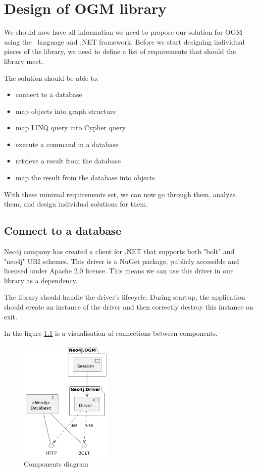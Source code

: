 \chapter {Design of OGM library}

We should now have all information we need to propose our solution for OGM using the \CS\ language and .NET framework.
Before we start designing individual pieces of the library, we need to define a list of requirements that should the library meet.

The solution should be able to:
\begin{itemize}
    \item {connect to a database}
    \item {map objects into graph structure}
    \item {map LINQ query into Cypher query}
    \item {execute a command in a database}
    \item {retrieve a result from the database}
    \item {map the result from the database into objects}
\end{itemize}

With these minimal requirements set, we can now go through them, analyze them, and design individual solutions for them.

\section{Connect to a database}

Neo4j company has created a client for .NET that supports both "bolt" and "neo4j" URI schemes. \cite{noauthor_client_nodate}
This driver is a NuGet package, publicly accessible and licensed under Apache 2.0 license.
This means we can use this driver in our library as a dependency.

The library should handle the driver's lifecycle.
During startup, the application should create an instance of the driver and then correctly destroy this instance on exit.

In the figure \ref{fig:components} is a visualisation of connections between components.

\begin{figure}[H]
    \centering
    \includegraphics[width=0.4\textwidth]{content/components.png}
    \caption{Components diagram}
    \label{fig:components}
\end{figure}

